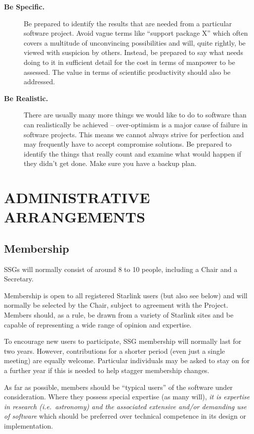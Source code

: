 \documentclass[twoside,11pt]{article}
\newcommand{\htmladdnormallink}[2]{#1}
\newcommand{\xlabel}[1]{}
\newcommand{\sitesref}[1]{\htmladdnormallink{#1}{http://star-www.rl.ac.uk/sites.html}}
\newcommand{\st}[1]{{\em{#1}}}
\newcommand{\qt}[1]{``#1''}
\newcommand{\qt}[1]{{\tt{"}}#1{\tt{"}}}
\begin{document}
\begin{description}
\item[{\bf Be Specific.}] Be prepared to identify the results that are
needed from a particular software project. Avoid vague terms like
\qt{support package X} which often covers a multitude of unconvincing
possibilities and will, quite rightly, be viewed with suspicion by
others. Instead, be prepared to say what needs doing to it in
sufficient detail for the cost in terms of manpower to be assessed.
The value in terms of scientific productivity should also be
addressed.

\item[{\bf Be Realistic.}] There are usually many more things we would
like to do to software than can realistically be achieved --
over-optimism is a major cause of failure in software projects. This
means we cannot always strive for perfection and may frequently have
to accept compromise solutions.  Be prepared to identify the things
that really count and examine what would happen if they didn't get
done. Make sure you have a backup plan.

\end{description}

\section{\xlabel{admin_arrangements}\label{sect:admin}ADMINISTRATIVE ARRANGEMENTS}

\subsection{Membership}

SSGs will normally consist of around 8 to 10 people, including a Chair
and a Secretary.

Membership is open to all registered Starlink users (but also see
below) and will normally be selected by the Chair, subject to
agreement with the Project. Members should, as a rule, be drawn from a
variety of \sitesref{Starlink sites} and be capable of representing a
wide range of opinion and expertise.

To encourage new users to participate, SSG membership will normally
last for two years. However, contributions for a shorter period (even
just a single meeting) are equally welcome. Particular individuals may
be asked to stay on for a further year if this is needed to help stagger
membership changes.

As far as possible, members should be \qt{typical users} of the
software under consideration. Where they possess special expertise (as
many will), \st{it is expertise in research (\st{i.e.}\ astronomy) and
the associated extensive and/or demanding use of software} which
should be preferred over technical competence in its design or
implementation.
\end{document}
